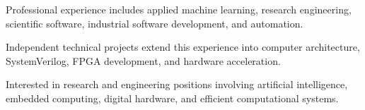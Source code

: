 \documentclass[english,a4paper]{europasscv}
\begin{document}
\begin{europasscv}
{Professional experience includes applied
machine learning, research engineering,
scientific software, industrial software
development, and automation.

Independent technical projects extend
this experience into computer architecture,
SystemVerilog, FPGA development,
and hardware acceleration.

Interested in research and engineering
positions involving artificial intelligence,
embedded computing, digital hardware,
and efficient computational systems.
}


\end{europasscv}
\end{document}
